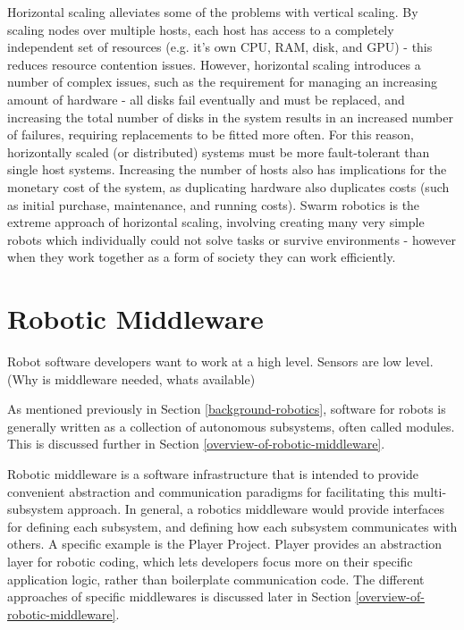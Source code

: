 \documentclass[../dissertation.tex]{subfiles}
\begin{document}
Horizontal scaling alleviates some of the problems with vertical scaling. By scaling nodes over multiple hosts, each host has access to a completely independent set of resources (e.g. it's own CPU, RAM, disk, and GPU) - this reduces resource contention issues. However, horizontal scaling introduces a number of complex issues, such as the requirement for managing an increasing amount of hardware - all disks fail eventually and must be replaced, and increasing the total number of disks in the system results in an increased number of failures, requiring replacements to be fitted more often. For this reason, horizontally scaled (or distributed) systems must be more fault-tolerant than single host systems. Increasing the number of hosts also has implications for the monetary cost of the system, as duplicating hardware also duplicates costs (such as initial purchase, maintenance, and running costs). Swarm robotics is the extreme approach of horizontal scaling, involving creating many very simple robots which individually could not solve tasks or survive environments - however when they work together as a form of society they can work efficiently\cite{csahin2004swarm}.

\section{Robotic Middleware}
\label{robotic-middleware}

Robot software developers want to work at a high level. Sensors are low level. (Why is middleware needed, whats available)

As mentioned previously in Section \ref{background-robotics}, software for robots is generally written as a collection of autonomous subsystems, often called modules. This is discussed further in Section \ref{overview-of-robotic-middleware}.

Robotic middleware is a software infrastructure that is intended to provide convenient abstraction and communication paradigms for facilitating this multi-subsystem approach. In general, a robotics middleware would provide interfaces for defining each subsystem, and defining how each subsystem communicates with others. A specific example is the Player Project. Player provides an abstraction layer for robotic coding, which lets developers focus more on their specific application logic, rather than boilerplate communication code\cite{vaughan2003device}. The different approaches of specific middlewares is discussed later in Section \ref{overview-of-robotic-middleware}.
\end{document}
